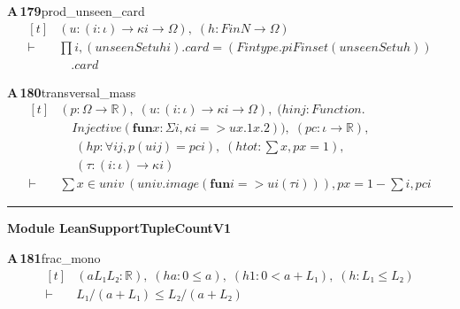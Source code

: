 \documentclass[conference]{IEEEtran}
\theoremstyle{definition}
\newcommand{\lean}[1]{\textsf{\footnotesize #1}}
\begin{document}
\noindent\textbf{A\,179}\quad\lean{prod\_unseen\_card}
{\footnotesize\[ \begin{aligned}[t]
&(\mathit{u} : (\mathit{i} : \iota ) \to \kappa \mathit{i} \to \Omega ),\; (\mathit{h} : \mathit{Fin} \mathit{N} \to \Omega )\\
\vdash\;&\textstyle\prod \mathit{i}, (\mathit{unseenSet} \mathit{u} \mathit{h} \mathit{i}).\mathit{card} = (\mathit{Fintype}.\mathit{piFinset} (\mathit{unseenSet} \mathit{u} \mathit{h}))\\
&\quad .\mathit{card}
\end{aligned} \]}

\noindent\textbf{A\,180}\quad\lean{transversal\_mass}
{\footnotesize\[ \begin{aligned}[t]
&(\mathit{p} : \Omega \to \mathbb{R} ),\; (\mathit{u} : (\mathit{i} : \iota ) \to \kappa \mathit{i} \to \Omega ),\; (\mathit{hinj} : \mathit{Function}.\\
&\quad \mathit{Injective} (\mathbf{fun} \mathit{x} : \Sigma \mathit{i}, \kappa \mathit{i} => \mathit{u} \mathit{x}.1 \mathit{x}.2)),\; (\mathit{pc} : \iota \to \mathbb{R} ),\\
&\quad \; (\mathit{hp} : \forall \mathit{i} \mathit{j}, \mathit{p} (\mathit{u} \mathit{i} \mathit{j}) = \mathit{pc} \mathit{i}),\; (\mathit{htot} : \textstyle\sum \mathit{x}, \mathit{p} \mathit{x} = 1),\\
&\quad \; (\tau : (\mathit{i} : \iota ) \to \kappa \mathit{i})\\
\vdash\;&\textstyle\sum \mathit{x} \in \mathit{univ} \ (\mathit{univ}.\mathit{image} (\mathbf{fun} \mathit{i} => \mathit{u} \mathit{i} (\tau \mathit{i}))), \mathit{p} \mathit{x} = 1 - \textstyle\sum \mathit{i}, \mathit{pc} \mathit{i}
\end{aligned} \]}

\vspace{4pt}\noindent\rule{\columnwidth}{0.4pt}\par\vspace{2pt}
\noindent\textbf{Module \lean{LeanSupportTupleCountV1}}\par\vspace{3pt}

\noindent\textbf{A\,181}\quad\lean{frac\_mono}
{\footnotesize\[ \begin{aligned}[t]
&(\mathit{a} \mathit{L₁} \mathit{L₂} : \mathbb{R} ),\; (\mathit{ha} : 0 \leq \mathit{a}),\; (\mathit{h1} : 0 < \mathit{a} + \mathit{L₁}),\; (\mathit{h} : \mathit{L₁} \leq \mathit{L₂})\\
\vdash\;&\mathit{L₁}/(\mathit{a} + \mathit{L₁}) \leq \mathit{L₂}/(\mathit{a} + \mathit{L₂})
\end{aligned} \]}
\end{document}
